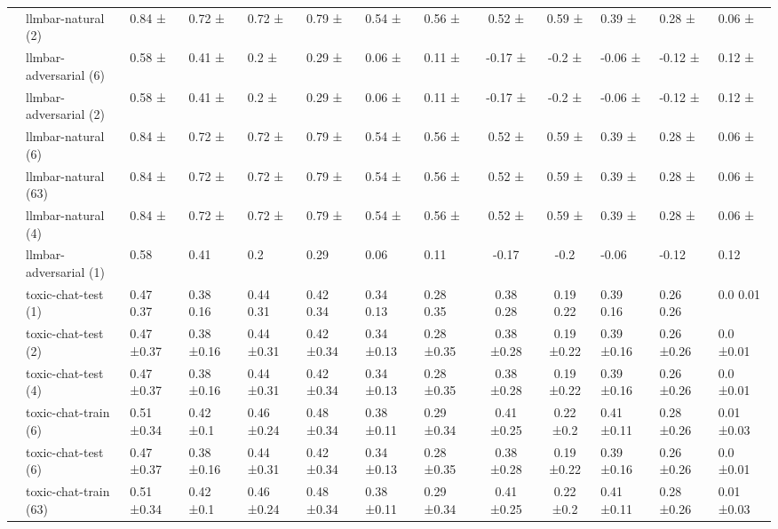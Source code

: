 \begin{tabular}{llllllll|cc}
 & llmbar-natural (2) & 0.84 ± & 0.72 ± & 0.72 ± & 0.79 ± & 0.54 ± & 0.56 ± & 0.52 ± & 0.59 ± & 0.39 ± & 0.28 ± & 0.06 ± \\
 & llmbar-adversarial (6) & 0.58 ± & 0.41 ± & 0.2 ± & 0.29 ± & 0.06 ± & 0.11 ± & -0.17 ± & -0.2 ± & -0.06 ± & -0.12 ± & 0.12 ± \\
 & llmbar-adversarial (2) & 0.58 ± & 0.41 ± & 0.2 ± & 0.29 ± & 0.06 ± & 0.11 ± & -0.17 ± & -0.2 ± & -0.06 ± & -0.12 ± & 0.12 ± \\
 & llmbar-natural (6) & 0.84 ± & 0.72 ± & 0.72 ± & 0.79 ± & 0.54 ± & 0.56 ± & 0.52 ± & 0.59 ± & 0.39 ± & 0.28 ± & 0.06 ± \\
 & llmbar-natural (63) & 0.84 ± & 0.72 ± & 0.72 ± & 0.79 ± & 0.54 ± & 0.56 ± & 0.52 ± & 0.59 ± & 0.39 ± & 0.28 ± & 0.06 ± \\
 & llmbar-natural (4) & 0.84 ± & 0.72 ± & 0.72 ± & 0.79 ± & 0.54 ± & 0.56 ± & 0.52 ± & 0.59 ± & 0.39 ± & 0.28 ± & 0.06 ± \\
 & llmbar-adversarial (1) & 0.58  & 0.41  & 0.2  & 0.29  & 0.06  & 0.11  & -0.17  & -0.2  & -0.06  & -0.12  & 0.12  \\
 & toxic-chat-test (1) & 0.47 0.37 & 0.38 0.16 & 0.44 0.31 & 0.42 0.34 & 0.34 0.13 & 0.28 0.35 & 0.38 0.28 & 0.19 0.22 & 0.39 0.16 & 0.26 0.26 & 0.0 0.01 \\
 & toxic-chat-test (2) & 0.47 ±0.37 & 0.38 ±0.16 & 0.44 ±0.31 & 0.42 ±0.34 & 0.34 ±0.13 & 0.28 ±0.35 & 0.38 ±0.28 & 0.19 ±0.22 & 0.39 ±0.16 & 0.26 ±0.26 & 0.0 ±0.01 \\
 & toxic-chat-test (4) & 0.47 ±0.37 & 0.38 ±0.16 & 0.44 ±0.31 & 0.42 ±0.34 & 0.34 ±0.13 & 0.28 ±0.35 & 0.38 ±0.28 & 0.19 ±0.22 & 0.39 ±0.16 & 0.26 ±0.26 & 0.0 ±0.01 \\
 & toxic-chat-train (6) & 0.51 ±0.34 & 0.42 ±0.1 & 0.46 ±0.24 & 0.48 ±0.34 & 0.38 ±0.11 & 0.29 ±0.34 & 0.41 ±0.25 & 0.22 ±0.2 & 0.41 ±0.11 & 0.28 ±0.26 & 0.01 ±0.03 \\
 & toxic-chat-test (6) & 0.47 ±0.37 & 0.38 ±0.16 & 0.44 ±0.31 & 0.42 ±0.34 & 0.34 ±0.13 & 0.28 ±0.35 & 0.38 ±0.28 & 0.19 ±0.22 & 0.39 ±0.16 & 0.26 ±0.26 & 0.0 ±0.01 \\
 & toxic-chat-train (63) & 0.51 ±0.34 & 0.42 ±0.1 & 0.46 ±0.24 & 0.48 ±0.34 & 0.38 ±0.11 & 0.29 ±0.34 & 0.41 ±0.25 & 0.22 ±0.2 & 0.41 ±0.11 & 0.28 ±0.26 & 0.01 ±0.03 \\

\end{tabular}
